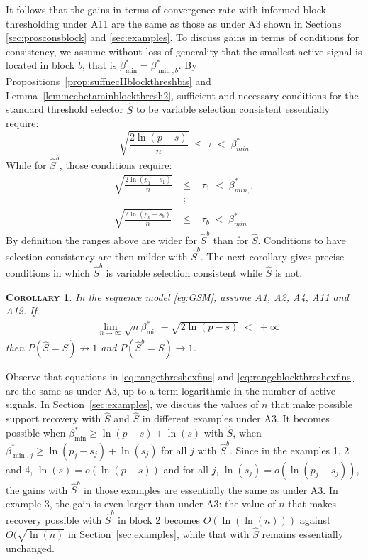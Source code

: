 \documentclass[aos]{imsart}
\theoremstyle{plain}
\newtheorem{cor}[thm]{\textsc{Corollary}}
\begin{document}
It follows that the gains in terms of convergence rate with informed block thresholding under A11 are the same as those as under A3 shown in Sections \ref{sec:prosconsblock} and \ref{sec:examples}. To discuss gains in terms of conditions for consistency, we assume without loss of generality that the smallest active signal is located in block $b$, that is $\beta_{\min}^*=\beta_{\min,b}^*$. By Propositions~\ref{prop:suffnecIIblockthreshbis} and Lemma~\ref{lem:necbetaminblockthresh2}, sufficient and necessary conditions for the standard threshold selector $\hat S$ to be variable selection consistent essentially require:
\begin{equation}\label{eq:rangethreshexfins}
     \sqrt{\frac{2\ln(p-s)}{n}}\; \leq \;\tau\; < \;\beta_{min}^*
\end{equation}
While for $\hat{S}^b$, those conditions require:
\begin{eqnarray}\label{eq:rangeblockthreshexfins}
    \sqrt{\frac{2\ln(p_1-s_1)}{n}}\; &\leq& \;\tau_1\; < \;\beta_{min,1}^* \nonumber\\
    &\vdots&\\
    \sqrt{\frac{2\ln(p_b-s_b)}{n}}\; &\leq& \;\tau_b\; < \;\beta_{min}^* \nonumber\end{eqnarray}
By definition the ranges above are wider for $\hat S^b$ than for $\hat S$. Conditions to have selection consistency are then milder with $\hat S^b$. The next corollary gives precise conditions in which $\hat S^b$ is variable selection consistent while $\hat S$ is not.
\begin{cor}\label{cor:sfin}
 In the sequence model \eqref{eq:GSM}, assume A1, A2, A4, A11 and A12.  If
\begin{eqnarray*}
&\lim_{n\to\infty}\sqrt{n}\beta_{\min}^*-\sqrt{2\ln(p-s)} \;<\;+\infty
\end{eqnarray*}
then 
$P(\hat{S} = S)\not \to 1$ and $P(\hat{S}^{b} = S)\to 1$.  
\end{cor}
Observe that equations in \eqref{eq:rangethreshexfins} and \eqref{eq:rangeblockthreshexfins} are the same as under A3, up to a term logarithmic in the number of active signals. In Section~\ref{sec:examples}, we discuss the values of $n$ that make possible support recovery with $\hat S$ and $\hat S$ in different examples under A3. It becomes possible when $\beta^*_{\min} \geq \ln(p-s)+\ln(s)$ with $\hat S$, when $\beta^*_{\min,j} \geq \ln(p_j-s_j)+\ln(s_j)$ for all $j$ with $\hat S^b$. Since in the examples 1, 2 and 4, $\ln(s)=o(\ln(p-s))$ and for all $j$, $\ln(s_j)=o(\ln(p_j-s_j))$, the gains with $\hat S^b$ in those examples are essentially the same as under A3. In example 3, the gain is even larger than under A3: the value of $n$ that makes recovery possible with $\hat S^b$ in block 2 becomes $O(\ln(\ln(n)))$ against $O(\sqrt{\ln(n)}$ in Section~\ref{sec:examples}, while that with $\hat S$ remains essentially unchanged.
\end{document}
